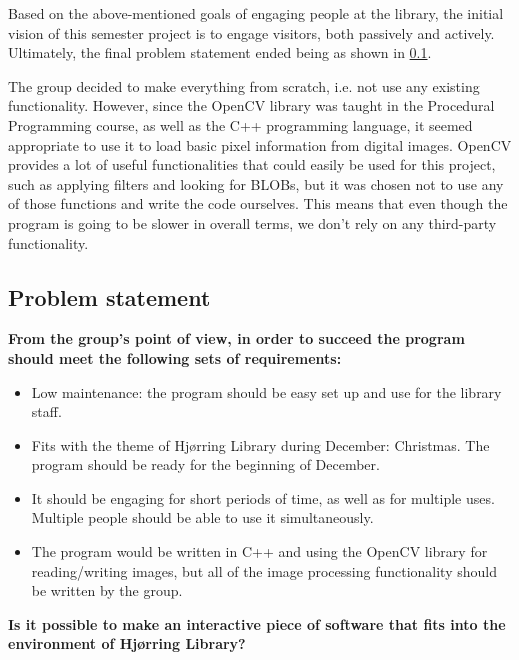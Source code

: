 Based on the above-mentioned goals of engaging people at the library, the initial vision of this semester project is to engage visitors, both passively and actively. Ultimately, the final problem statement ended being as shown in \ref{problemStatement}.

The group decided to make everything from scratch, i.e. not use any existing functionality. However, since the OpenCV library was taught in the Procedural Programming course, as well as the C++ programming language, it seemed appropriate to use it to load basic pixel information from digital images. OpenCV provides a lot of useful functionalities that could easily be used for this project, such as applying filters and looking for BLOBs, but it was chosen not to use any of those functions and write the code ourselves. This means that even though the program is going to be slower in overall terms, we don't rely on any third-party functionality.

\subsection{Problem statement}\label{problemStatement}
\textbf{From the group's point of view, in order to succeed the program should meet the following sets of requirements:}

\begin{itemize}
\item Low maintenance: the program should be easy set up and use for the library staff.
\item Fits with the theme of Hj{\o}rring Library during December: Christmas. The program should be ready for the beginning of December.
\item It should be engaging for short periods of time, as well as for multiple uses. Multiple people should be able to use it simultaneously.
\item The program would be written in C++ and using the OpenCV library for reading/writing images, but all of the image processing functionality should be written by the group.
\end{itemize}

\textbf{Is it possible to make an interactive piece of software that fits into the environment of Hj{\o}rring Library?}